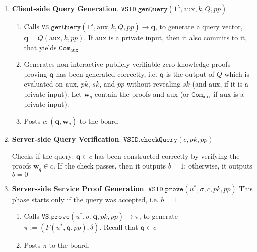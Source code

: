 \begin{enumerate}
\item\textbf{Client-side Query Generation}\label{VSID::Client-side-QueryGeneration}. $\mathtt{VSID.genQuery}(1^{\lambda},  \text{aux},k,Q,{pp} )$ 
\begin{enumerate}
\item Calls $\mathtt{VS.genQuery}(1^{\lambda}, \text{aux},k,Q,{pp} )\rightarrow \bm{q}$, to generate a query vector, $\bm{q}=Q(\text{aux},k,{pp})$. If $\text{aux}$ is a private input, then it also commits to it,  that yields  $\mathtt{Com}_{\scriptscriptstyle \text{aux}}$
\item Generates non-interactive publicly verifiable zero-knowledge proofs proving $\bm{q}$ has been generated correctly, i.e. $\bm{q}$ is the
output of $Q$ which is evaluated on $\text{aux}$, $pk$, $sk$, and $pp$ without revealing $sk$ (and $\text{aux}$, if it is a private input). Let $\bm{w}_{\scriptscriptstyle q}$ contain the proofs and  $\text{aux}$ (or  $\mathtt{Com}_{\scriptscriptstyle \text{aux}}$ if $\text{aux}$ is a private input).
\item Posts $c:(\bm{q},\bm{w}_{\scriptscriptstyle q})$ to the board 
\end{enumerate}

\item\textbf{Server-side Query Verification}. $\mathtt{VSID.checkQuery}(c, pk, {pp})$

Checks if   the query: $\bm{q}\in c$ has been constructed correctly by verifying the proofs  $\bm{w}_{\scriptscriptstyle q}\in c$. If the check passes, then it outputs $b=1$; otherwise, it outputs $b=0$



\item\textbf{Server-side Service Proof Generation}. $\mathtt{VSID.prove}(u^{\scriptscriptstyle *},\sigma,c,pk,{pp} )$ This phase starts only if the query was accepted, i.e. $b=1$ 
\begin{enumerate}
\item Calls $\mathtt{VS.prove}(u^{\scriptscriptstyle *},\sigma, \bm{q},pk,{pp})\rightarrow \pi$, to generate $\pi:=(F(u^{\scriptscriptstyle *},\bm{q},{pp}),\delta)$. Recall that $\bm{q}\in c$
\item Posts $\pi$ to the board. 
\end{enumerate}


\end{enumerate}
